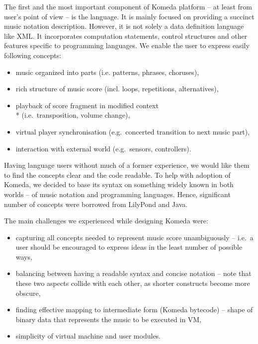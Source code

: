 \documentclass{article}
\begin{document}
The first and the most important component of Komeda platform -- at least from
user's point of view -- is the language.  It is mainly focused on providing a
succinct music notation description.  However, it is not solely a data
definition language like XML. It incorporates computation statements, control
structures and other features specific to programming languages.  We enable the
user to express easily following concepts:

\begin{itemize}
  \item music organized into parts (i.e. patterns, phrases, choruses),
  \item rich structure of music score (incl. loops, repetitions, alternatives),
  \item playback of score fragment in modified context \\*
    (i.e.~transposition, volume change),
  \item virtual player synchronisation (e.g.~concerted transition to next
    music part), 
  \item interaction with external world (e.g.~sensors, controllers).
\end{itemize}

Having language users without much of a former experience, we would like them
to find the concepts clear and the code readable. To help with adoption of
Komeda, we decided to base its syntax on something widely known in both worlds
-- of music notation and programming languages. Hence, significant number
of concepts were borrowed from LilyPond \cite{lily} and Java. 

The main challenges we experienced while designing Komeda were:
\begin{itemize}
  \item capturing all concepts needed to represent music score unambiguously --
    i.e.~a user should be encouraged to express ideas in the least number of
    possible ways,
  \item balancing between having a readable syntax and concise notation -- note
    that these two aspects collide with each other, as shorter constructs
    become more obscure,
  \item finding effective mapping to intermediate form (Komeda bytecode) --
    shape of binary data that represents the music to be executed in VM,
  \item simplicity of virtual machine and user modules.
\end{itemize}
\end{document}
